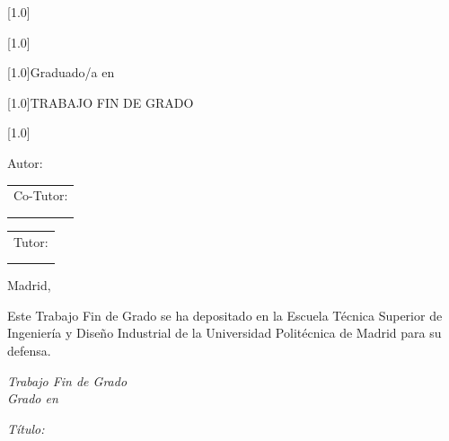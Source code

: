 \begin{titlepage}
{\begin{center}
    \scalebox{.7}[1.0]{\huge{\MakeUppercase{\Universidad}}} \vspace*{1cm}

    \scalebox{.7}[1.0]{\huge{\MakeUppercase{\Centro}}} \vspace*{0.8cm}
    
    \scalebox{.7}[1.0]{\LARGE{Graduado/a en \Grado}} \vspace*{0.25cm}

    \scalebox{.7}[1.0]{\Huge{TRABAJO FIN DE GRADO}} \vspace*{2.0cm}

    \scalebox{.7}[1.0]{\LARGE{\textbf{\TituloTFG}}} \vspace*{2.0cm}

    \LARGE{Autor: \NombreAutor}

  \end{center}

    }

  \vspace*{2.0cm}

  \begin{minipage}{0.1\linewidth}
    \hspace*{-1.5cm}
    \noindent
    \begin{tabular}{l}
      Co-Tutor: \\
      \NombreCoTutor{} \\
      \DepartamentoCoTutor{}
    \end{tabular}
  \end{minipage}
  \begin{minipage}{0.4\linewidth}
    \begin{center}
      \qquad
    \end{center}
  \end{minipage}
  \begin{minipage}{0.1\linewidth}
    \noindent
    \begin{tabular}{l}
      Tutor: \\
      \NombreTutor{} \\
      \DepartamentoTutor{}
    \end{tabular}
  \end{minipage}

  \begin{flushright}
    \vspace*{\fill}
    Madrid, \FechaLectura
  \end{flushright}

  \newpage
  \thispagestyle{empty}
  \noindent
  Este Trabajo Fin de Grado se ha depositado en la Escuela Técnica Superior de Ingeniería y Diseño Industrial de la Universidad Politécnica de Madrid para su defensa.

  \vspace*{4cm}
  \noindent
  \textit{Trabajo Fin de Grado}\\
  \textit{Grado en} \Grado{}
  
  \textit{Título:} \TituloTFG{}

  \FechaLectura

  \vspace*{3cm}

\end{titlepage}
